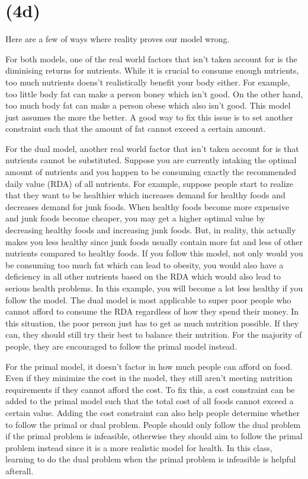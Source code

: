 \documentclass[17pt]{extarticle}
\begin{document}
\section*{(4d)}
Here are a few of ways where reality proves our model wrong.

\bigskip For both models, one of the real world factors that isn't taken account for is the diminising returns for nutrients. While it is crucial to consume enough nutrients, too much nutrients doens't realistically benefit your body either. For example, too little body fat can make a person boney which isn't good. On the other hand, too much body fat can make a person obese which also isn't good. This model just assumes the more the better. A good way to fix this issue is to set another constraint such that the amount of fat cannot exceed a certain amount.

\bigskip For the dual model, another real world factor that isn't taken account for is that nutrients cannot be substituted. Suppose you are currently intaking the optimal amount of nutrients and you happen to be consuming exactly the recommended daily value (RDA) of all nutrients. For example, suppose people start to realize that they want to be healthier which increases demand for healthy foods and decreases demand for junk foods. When healthy foods become more expensive and junk foods become cheaper, you may get a higher optimal value by decreasing healthy foods and increasing junk foods. But, in reality, this actually makes you less healthy since junk foods usually contain more fat and less of other nutrients compared to healthy foods. If you follow this model, not only would you be consuming too much fat which can lead to obesity, you would also have a deficiency in all other nutrients based on the RDA which would also lead to serious health problems. In this example, you will become a lot less healthy if you follow the model. The dual model is most applicable to super poor people who cannot afford to consume the RDA regardless of how they spend their money. In this situation, the poor person just has to get as much nutrition possible. If they can, they should still try their best to balance their nutrition. For the majority of people, they are encouraged to follow the primal model instead.

\bigskip For the primal model, it doesn't factor in how much people can afford on food. Even if they minimize the cost in the model, they still aren't meeting nutrition requirements if they cannot afford the cost. To fix this, a cost constraint can be added to the primal model such that the total cost of all foods cannot exceed a certain value. Adding the cost constraint can also help people determine whether to follow the primal or dual problem.  People should only follow the dual problem if the primal problem is infeasible, otherwise they should aim to follow the primal problem instead since it is a more realistic model for health. In this class, learning to do the dual problem when the primal problem is infeasible is helpful afterall.
\end{document}
